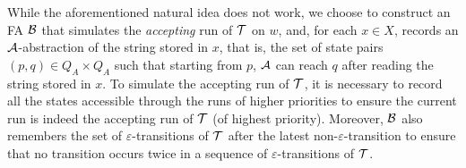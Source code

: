             While the aforementioned natural idea does not work,  we choose to construct an FA $\mathcal{B}$ that simulates the \emph{accepting} run of $\mathcal{T}$ on $w$, and, for each $x \in X$, records an $\mathcal{A}$-abstraction of the string stored in $x$, that is, the set of state pairs $(p, q) \in Q_A \times Q_A$ such that starting from $p$, $\mathcal{A}$ can reach $q$ after reading the string stored in $x$. 
            To simulate the accepting run of $\mathcal{T}$, it is necessary to record all the states accessible through the runs of higher priorities to ensure the current run is indeed the accepting run of $\mathcal{T}$ (of highest priority). Moreover, $\mathcal{B}$ also remembers the set of $\varepsilon$-transitions of $\mathcal{T}$ after the latest non-$\varepsilon$-transition to ensure that no transition occurs twice in a sequence of $\varepsilon$-transitions of $\mathcal{T}$.

